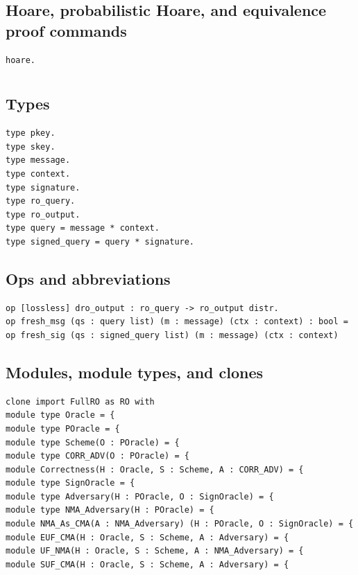 \subsection*{Hoare, probabilistic Hoare, and equivalence proof commands}
\begin{lstlisting}[language=EasyCrypt,basicstyle=\ttfamily\tiny]
hoare.
\end{lstlisting}

\section*{}

\subsection*{Types}
\begin{lstlisting}[language=EasyCrypt,basicstyle=\ttfamily\tiny]
type pkey.
type skey.
type message.
type context.
type signature.
type ro_query.
type ro_output.
type query = message * context.
type signed_query = query * signature.
\end{lstlisting}

\subsection*{Ops and abbreviations}
\begin{lstlisting}[language=EasyCrypt,basicstyle=\ttfamily\tiny]
op [lossless] dro_output : ro_query -> ro_output distr.
op fresh_msg (qs : query list) (m : message) (ctx : context) : bool =
op fresh_sig (qs : signed_query list) (m : message) (ctx : context)
\end{lstlisting}

\subsection*{Modules, module types, and clones}
\begin{lstlisting}[language=EasyCrypt,basicstyle=\ttfamily\tiny]
clone import FullRO as RO with
module type Oracle = {
module type POracle = {
module type Scheme(O : POracle) = {
module type CORR_ADV(O : POracle) = {
module Correctness(H : Oracle, S : Scheme, A : CORR_ADV) = {
module type SignOracle = {
module type Adversary(H : POracle, O : SignOracle) = {
module type NMA_Adversary(H : POracle) = {
module NMA_As_CMA(A : NMA_Adversary) (H : POracle, O : SignOracle) = {
module EUF_CMA(H : Oracle, S : Scheme, A : Adversary) = {
module UF_NMA(H : Oracle, S : Scheme, A : NMA_Adversary) = {
module SUF_CMA(H : Oracle, S : Scheme, A : Adversary) = {
\end{lstlisting}

